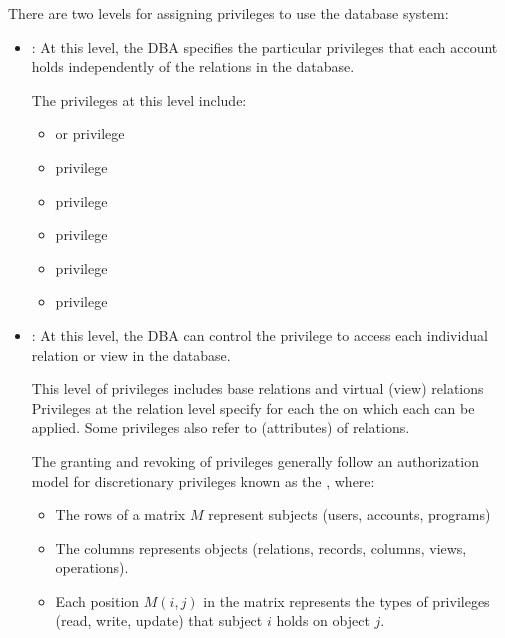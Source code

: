     \par There are two levels for assigning privileges to use the database system:
      \begin{itemize}
        \item {}: At this level, the DBA specifies the particular privileges that each account holds independently of the relations in the database.
          \par The privileges at this level include:
            \begin{itemize}
              \item {} or  privilege
              \item {} privilege
              \item {} privilege
              \item {} privilege
              \item {} privilege
              \item {} privilege
            \end{itemize}
        \item {}: At this level, the DBA can control the privilege to access each individual relation or view in the database.
          \par This level of privileges includes base relations and virtual (view) relations Privileges at the relation level specify for each  the  on which each  can be applied. Some privileges also refer to  (attributes) of relations.
          \par The granting and revoking of privileges generally follow an authorization model for discretionary privileges known as the , where:
          \begin{itemize}
            \item The rows of a matrix $M$ represent subjects (users, accounts, programs)
            \item The columns represents objects (relations, records, columns, views, operations).
            \item Each position $M(i, j)$ in the matrix represents the types of privileges (read, write, update) that subject $i$ holds on object $j$.
          \end{itemize}
      \end{itemize}
